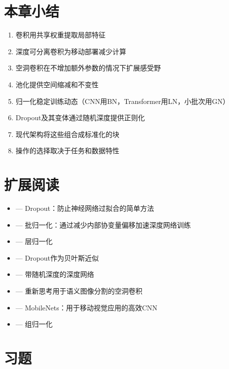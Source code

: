 \section{本章小结}

\begin{enumerate}
    \item 卷积用共享权重提取局部特征
    \item 深度可分离卷积为移动部署减少计算
    \item 空洞卷积在不增加额外参数的情况下扩展感受野
    \item 池化提供空间缩减和不变性
    \item 归一化稳定训练动态（CNN用BN，Transformer用LN，小批次用GN）
    \item Dropout及其变体通过随机深度提供正则化
    \item 现代架构将这些组合成标准化的块
    \item 操作的选择取决于任务和数据特性
\end{enumerate}

\section{扩展阅读}

\begin{itemize}
    \item \cite{srivastava2014dropout} --- Dropout：防止神经网络过拟合的简单方法
    \item \cite{ioffe2015batch} --- 批归一化：通过减少内部协变量偏移加速深度网络训练
    \item \cite{ba2016layer} --- 层归一化
    \item \cite{gal2016dropout} --- Dropout作为贝叶斯近似
    \item \cite{huang2016deep} --- 带随机深度的深度网络
    \item \cite{chen2017deeplab} --- 重新思考用于语义图像分割的空洞卷积
    \item \cite{howard2017mobilenets} --- MobileNets：用于移动视觉应用的高效CNN
    \item \cite{wu2018group} --- 组归一化
\end{itemize}

\section{习题}

